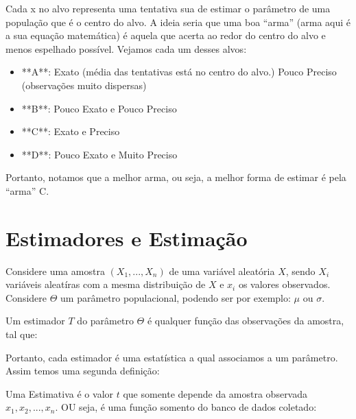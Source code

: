 \documentclass[
  letterpaper,
  DIV=11,
  numbers=noendperiod]{scrartcl}
\begin{document}
Cada x no alvo representa uma tentativa sua de estimar o parâmetro de
uma população que é o centro do alvo. A ideia seria que uma boa ``arma''
(arma aqui é a sua equação matemática) é aquela que acerta ao redor do
centro do alvo e menos espelhado possível. Vejamos cada um desses alvos:

\begin{tcolorbox}
\begin{itemize}
\item **A**: Exato (média das tentativas está no centro do alvo.) Pouco Preciso (observações muito dispersas)
\item **B**: Pouco Exato e Pouco Preciso
\item **C**: Exato e Preciso
\item **D**: Pouco Exato e Muito Preciso
\end{itemize}
\end{tcolorbox}

Portanto, notamos que a melhor arma, ou seja, a melhor forma de estimar
é pela ``arma'' C.

\section{Estimadores e Estimação}\label{estimadores-e-estimauxe7uxe3o}

Considere uma amostra \((X_1, ..., X_n)\) de uma variável aleatória
\(X\), sendo \(X_i\) variáveis aleatíras com a mesma distribuição de
\(X\) e \(x_i\) os valores observados. Considere \(\Theta\) um parâmetro
populacional, podendo ser por exemplo: \(\mu\) ou \(\sigma\).

\begin{definicao}

Um estimador \(T\) do parâmetro \(\Theta\) é qualquer função das
observações da amostra, tal que: \vspace{0.7cm}

\end{definicao}

Portanto, cada estimador é uma estatística a qual associamos a um
parâmetro. Assim temos uma segunda definição:

\begin{definicao}

Uma Estimativa é o valor \(t\) que somente depende da amostra observada
\(x_1, x_2, ..., x_n\). OU seja, é uma função somento do banco de dados
coletado: \vspace{0.7cm} 

\end{definicao}
\end{document}
